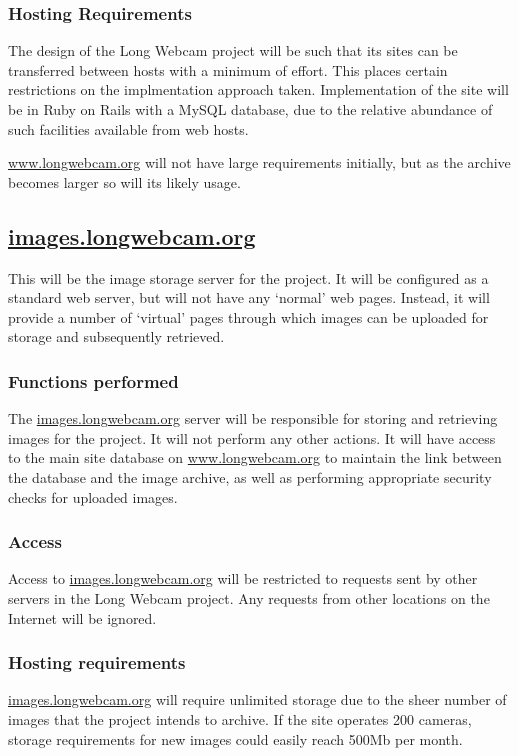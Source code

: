 \documentclass[11pt]{article}
\begin{document}
\subsubsection{Hosting Requirements}
The design of the Long Webcam project will be such that its sites can be transferred between hosts with a minimum of effort. This places certain restrictions on the implmentation approach taken. Implementation of the site will be in Ruby on Rails with a MySQL database, due to the relative abundance of such facilities available from web hosts.

\url{www.longwebcam.org} will not have large requirements initially, but as the archive becomes larger so will its likely usage.


\subsection{\protect\url{images.longwebcam.org}}
This will be the image storage server for the project. It will be configured as a standard web server, but will not have any `normal' web pages. Instead, it will provide a number of `virtual' pages through which images can be uploaded for storage and subsequently retrieved.

\subsubsection{Functions performed}
The \url{images.longwebcam.org} server will be responsible for storing and retrieving images for the project. It will not perform any other actions. It will have access to the main site database on \url{www.longwebcam.org} to maintain the link between the database and the image archive, as well as performing appropriate security checks for uploaded images.

\subsubsection{Access}
Access to \url{images.longwebcam.org} will be restricted to requests sent by other servers in the Long Webcam project. Any requests from other locations on the Internet will be ignored.

\subsubsection{Hosting requirements}
\label{sec:images_hosting}
\url{images.longwebcam.org} will require unlimited storage due to the sheer number of images that the project intends to archive. If the site operates 200 cameras, storage requirements for new images could easily reach 500Mb per month.
\end{document}
